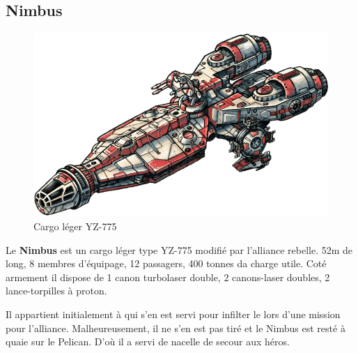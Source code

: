\subsection{Nimbus} \label{sec:nimbus}
\vspace{-4\baselineskip}
\begin{figure}[h!]
    \centering
    \includegraphics[width=\linewidth]{_img/dos-au-muur/nimbus.png}
    \caption{Cargo léger YZ-775}
\end{figure}

Le \textbf{Nimbus} est un cargo léger type YZ-775 modifié par l'alliance rebelle. 52m de long, 8 membres d'équipage, 12 passagers, 400 tonnes da charge utile. Coté armement il dispose de 1 canon turbolaser double, 2 canons-laser doubles, 2 lance-torpilles à proton.

Il appartient initialement à  qui s'en est servi pour infilter le  lors d'une mission pour l'alliance. Malheureusement, il ne s'en est pas tiré et le Nimbus est resté à quaie sur le Pelican. D'où il a servi de nacelle de secour aux héros.
